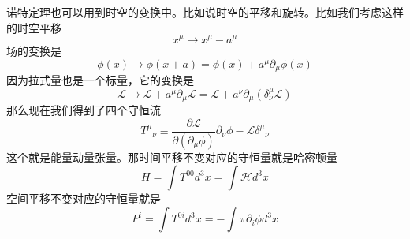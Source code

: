 诺特定理也可以用到时空的变换中。比如说时空的平移和旋转。比如我们考虑这样的时空平移
\begin{equation}
x^\mu \rightarrow x^\mu - a^\mu 
\end{equation}
场的变换是
\begin{equation}
\phi(x) \rightarrow \phi (x+a) = \phi (x) + a^\mu \partial_\mu \phi(x)
\end{equation}
因为拉式量也是一个标量，它的变换是
\begin{equation}
\mathcal L \rightarrow \mathcal L + a^\mu \partial_\mu \mathcal L  = \mathcal L + a^\nu \partial_\mu (\delta^\mu_\nu \mathcal L)
\end{equation}
那么现在我们得到了四个守恒流
\begin{equation}\label{classi_eq2}
T^\mu{}_\nu \equiv \frac{\partial \mathcal L}{\partial (\partial_\mu \phi)} \partial_\nu \phi - \mathcal L \delta^\mu{}_\nu
\end{equation}
这个就是能量动量张量。那时间平移不变对应的守恒量就是哈密顿量
\begin{equation}
H = \int T^{00} d^3 x = \int \mathcal H d^3 x
\end{equation}
空间平移不变对应的守恒量就是
\begin{equation}
P^i = \int T^{0i} d^3x = - \int \pi \partial_i \phi d^3 x 
\end{equation}
















